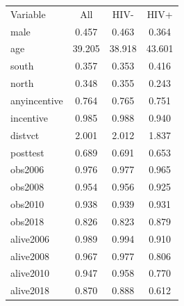 \begin{tabular}{lccc}
\hline
Variable & All & HIV- & HIV+ \\
male & 0.457 & 0.463 & 0.364 \\
age & 39.205 & 38.918 & 43.601 \\
south & 0.357 & 0.353 & 0.416 \\
north & 0.348 & 0.355 & 0.243 \\
anyincentive & 0.764 & 0.765 & 0.751 \\
incentive & 0.985 & 0.988 & 0.940 \\
distvct & 2.001 & 2.012 & 1.837 \\
posttest & 0.689 & 0.691 & 0.653 \\
obs2006 & 0.976 & 0.977 & 0.965 \\
obs2008 & 0.954 & 0.956 & 0.925 \\
obs2010 & 0.938 & 0.939 & 0.931 \\
obs2018 & 0.826 & 0.823 & 0.879 \\
alive2006 & 0.989 & 0.994 & 0.910 \\
alive2008 & 0.967 & 0.977 & 0.806 \\
alive2010 & 0.947 & 0.958 & 0.770 \\
alive2018 & 0.870 & 0.888 & 0.612 \\
\hline
\end{tabular}
